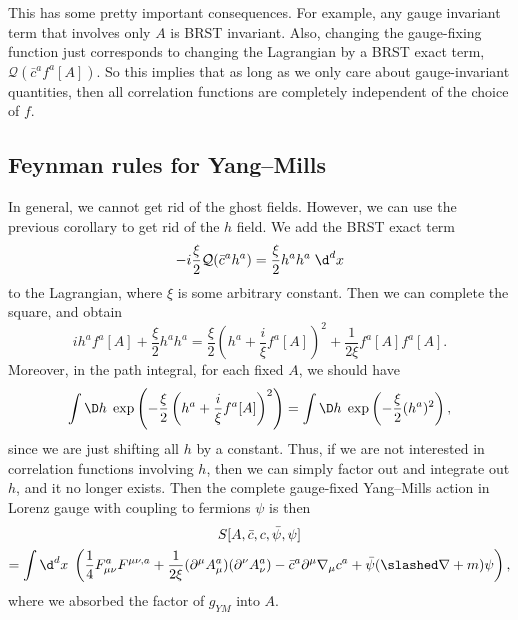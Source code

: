 \documentclass[a4paper]{article}
\begin{document}
This has some pretty important consequences. For example, any gauge invariant term that involves only $A$ is BRST invariant. Also, changing the gauge-fixing function just corresponds to changing the Lagrangian by a BRST exact term, $\mathcal{Q} (\bar{c}^a f^a[A])$. So this implies that as long as we only care about gauge-invariant quantities, then all correlation functions are completely independent of the choice of $f$.

\subsection{Feynman rules for Yang--Mills}
In general, we cannot get rid of the ghost fields. However, we can use the previous corollary to get rid of the $h$ field. We add the BRST exact term
\[
  -i\frac{\xi}{2} \mathcal{Q} (\bar{c}^a h^a) = \frac{\xi}{2} h^a h^a \;\d^d x
\]
to the Lagrangian, where $\xi$ is some arbitrary constant. Then we can complete the square, and obtain
\[
  i h^a f^a[A] + \frac{\xi}{2} h^a h^a = \frac{\xi}{2} \left(h^a + \frac{i}{\xi} f^a[A]\right)^2 + \frac{1}{2\xi} f^a[A] f^a[A].
\]
Moreover, in the path integral, for each fixed $A$, we should have
\[
  \int \D h\; \exp \left(-\frac{\xi}{2} \left(h^a + \frac{i}{\xi} f^a[A]\right)^2\right) = \int \D h\; \exp \left(-\frac{\xi}{2} (h^a)^2\right),
\]
since we are just shifting all $h$ by a constant. Thus, if we are not interested in correlation functions involving $h$, then we can simply factor out and integrate out $h$, and it no longer exists.
%
%
Then the complete gauge-fixed Yang--Mills action in Lorenz gauge with coupling to fermions $\psi$ is then
\begin{multline*}
  S[A, \bar{c}, c, \bar\psi, \psi]\\
  = \int\d^d x\; \left(\frac{1}{4} F_{\mu\nu}^a F^{\mu\nu,a} + \frac{1}{2\xi} (\partial^\mu A_\mu^a) (\partial^\nu A_\nu^a) - \bar{c}^a \partial^\mu \nabla_\mu c^a + \bar\psi (\slashed\nabla + m)\psi\right), %
\end{multline*}
where we absorbed the factor of $g_{YM}$ into $A$.
\end{document}
